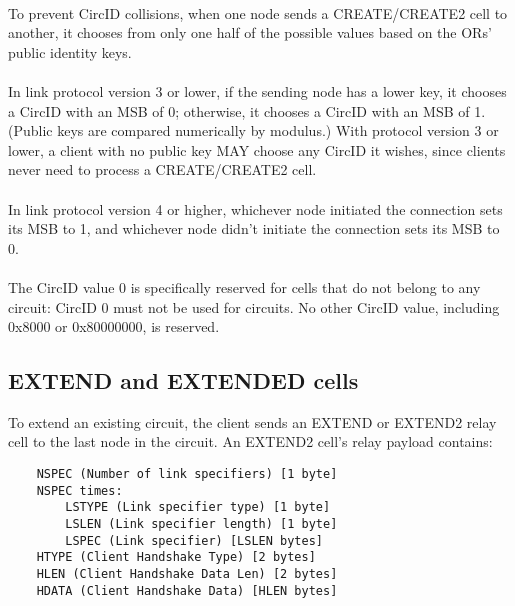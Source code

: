 \paragraph{}
To prevent CircID collisions, when one node sends a CREATE/CREATE2
cell to another, it chooses from only one half of the possible
values based on the ORs' public identity keys.

\paragraph{}
In link protocol version 3 or lower, if the sending node has a lower
key, it chooses a CircID with an MSB of 0; otherwise, it chooses a
CircID with an MSB of 1. (Public keys are compared numerically by
modulus.) With protocol version 3 or lower, a client with no public key
MAY choose any CircID it wishes, since clients never need to process a
CREATE/CREATE2 cell.

\paragraph{}
In link protocol version 4 or higher, whichever node initiated the
connection sets its MSB to 1, and whichever node didn't initiate the
connection sets its MSB to 0.

\paragraph{}
The CircID value 0 is specifically reserved for cells that do not
belong to any circuit: CircID 0 must not be used for circuits. No
other CircID value, including 0x8000 or 0x80000000, is reserved.

\subsection{EXTEND and EXTENDED cells}
To extend an existing circuit, the client sends an EXTEND or EXTEND2
relay cell to the last node in the circuit.
An EXTEND2 cell's relay payload contains:

\begin{verbatim}
    NSPEC (Number of link specifiers) [1 byte]
    NSPEC times:
        LSTYPE (Link specifier type) [1 byte]
        LSLEN (Link specifier length) [1 byte]
        LSPEC (Link specifier) [LSLEN bytes]
    HTYPE (Client Handshake Type) [2 bytes]
    HLEN (Client Handshake Data Len) [2 bytes]
    HDATA (Client Handshake Data) [HLEN bytes]
\end{verbatim}

